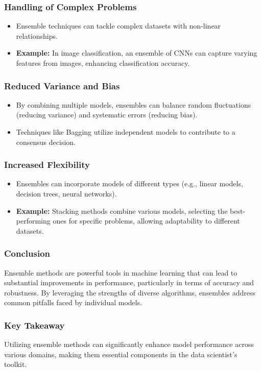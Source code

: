 \documentclass[aspectratio=169]{beamer}
\begin{document}
\begin{frame}[fragile]
    \frametitle{Handling of Complex Problems}
    \begin{itemize}
        \item Ensemble techniques can tackle complex datasets with non-linear relationships.
        \item \textbf{Example:} In image classification, an ensemble of CNNs can capture varying features from images, enhancing classification accuracy.
    \end{itemize}
\end{frame}

\begin{frame}[fragile]
    \frametitle{Reduced Variance and Bias}
    \begin{itemize}
        \item By combining multiple models, ensembles can balance random fluctuations (reducing variance) and systematic errors (reducing bias).
        \item Techniques like Bagging utilize independent models to contribute to a consensus decision.
    \end{itemize}
\end{frame}

\begin{frame}[fragile]
    \frametitle{Increased Flexibility}
    \begin{itemize}
        \item Ensembles can incorporate models of different types (e.g., linear models, decision trees, neural networks).
        \item \textbf{Example:} Stacking methods combine various models, selecting the best-performing ones for specific problems, allowing adaptability to different datasets.
    \end{itemize}
\end{frame}

\begin{frame}[fragile]
    \frametitle{Conclusion}
    Ensemble methods are powerful tools in machine learning that can lead to substantial improvements in performance, particularly in terms of accuracy and robustness. By leveraging the strengths of diverse algorithms, ensembles address common pitfalls faced by individual models.
\end{frame}

\begin{frame}[fragile]
    \frametitle{Key Takeaway}
    Utilizing ensemble methods can significantly enhance model performance across various domains, making them essential components in the data scientist's toolkit.
\end{frame}
\end{document}
